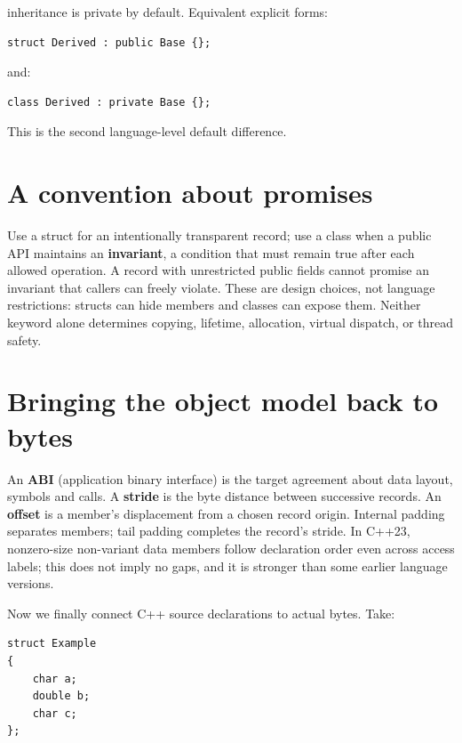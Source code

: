 inheritance is private by default. Equivalent explicit forms:

\begin{verbatim}
struct Derived : public Base {};
\end{verbatim}

and:

\begin{verbatim}
class Derived : private Base {};
\end{verbatim}

This is the second language-level default difference.

\section{A convention about promises}\label{05-engine-i-ch003-a-convention-about-promises}

Use a struct for an intentionally transparent record; use a class when a public API maintains an \textbf{invariant}, a condition that must remain true after each allowed operation. A record with unrestricted public fields cannot promise an invariant that callers can freely violate. These are design choices, not language restrictions: structs can hide members and classes can expose them. Neither keyword alone determines copying, lifetime, allocation, virtual dispatch, or thread safety.

\section{Bringing the object model back to bytes}\label{05-engine-i-ch003-bringing-the-object-model-back-to-bytes}

An \textbf{ABI} (application binary interface) is the target agreement about data layout, symbols and calls. A \textbf{stride} is the byte distance between successive records. An \textbf{offset} is a member's displacement from a chosen record origin. Internal padding separates members; tail padding completes the record's stride. In C++23, nonzero-size non-variant data members follow declaration order even across access labels; this does not imply no gaps, and it is stronger than some earlier language versions.

Now we finally connect C++ source declarations to actual bytes. Take:

\begin{verbatim}
struct Example
{
    char a;
    double b;
    char c;
};
\end{verbatim}

